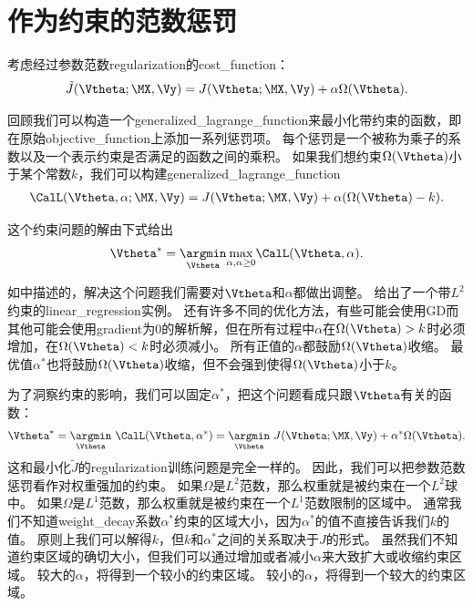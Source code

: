  
 \section{作为约束的范数惩罚}
 \label{sec:7.2}
考虑经过参数范数\gls{regularization}的\gls{cost_function}：
\begin{align}
 \tilde{J}(\Vtheta;\MX, \Vy) = J(\Vtheta;\MX, \Vy) + \alpha \Omega(\Vtheta) .
\end{align}

回顾我们可以构造一个\gls{generalized_lagrange_function}来最小化带约束的函数，即在原始\gls{objective_function}上添加一系列惩罚项。
每个惩罚是一个被称为乘子的系数以及一个表示约束是否满足的函数之间的乘积。
如果我们想约束$\Omega(\Vtheta)$小于某个常数$k$，我们可以构建\gls{generalized_lagrange_function}
\begin{align}
 \CalL(\Vtheta, \alpha; \MX, \Vy) = J(\Vtheta; \MX, \Vy) + \alpha (\Omega(\Vtheta) - k).
\end{align}

这个约束问题的解由下式给出
\begin{align}
 \Vtheta^* = \underset{\Vtheta}{ \argmin} \underset{\alpha, \alpha \geq 0}{\max} \CalL(\Vtheta, \alpha).
\end{align}

如中描述的，解决这个问题我们需要对$\Vtheta$和$\alpha$都做出调整。
给出了一个带$L^2$约束的\gls{linear_regression}实例。
还有许多不同的优化方法，有些可能会使用\gls{GD}而其他可能会使用\gls{gradient}为0的解析解，但在所有过程中$\alpha$在$\Omega(\Vtheta) > k$时必须增加，在$\Omega(\Vtheta) < k$时必须减小。
所有正值的$\alpha$都鼓励$\Omega(\Vtheta)$收缩。
最优值$\alpha^*$也将鼓励$\Omega(\Vtheta)$收缩，但不会强到使得$\Omega(\Vtheta)$小于$k$。

为了洞察约束的影响，我们可以固定$\alpha^*$，把这个问题看成只跟$\Vtheta$有关的函数：
\begin{align}
 \Vtheta^* =  \underset{\Vtheta}{ \argmin} ~\CalL(\Vtheta, \alpha^*) = 
 \underset{\Vtheta}{ \argmin}~
 J(\Vtheta; \MX, \Vy) + \alpha^* \Omega(\Vtheta).
\end{align}
这和最小化$\tilde J$的\gls{regularization}训练问题是完全一样的。
因此，我们可以把参数范数惩罚看作对权重强加的约束。
如果$\Omega$是$L^2$范数，那么权重就是被约束在一个$L^2$球中。
如果$\Omega$是$L^1$范数，那么权重就是被约束在一个$L^1$范数限制的区域中。
通常我们不知道\gls{weight_decay}系数$\alpha^*$约束的区域大小，因为$\alpha^*$的值不直接告诉我们$k$的值。
原则上我们可以解得$k$，但$k$和$\alpha^*$之间的关系取决于$J$的形式。
虽然我们不知道约束区域的确切大小，但我们可以通过增加或者减小$\alpha$来大致扩大或收缩约束区域。
较大的$\alpha$，将得到一个较小的约束区域。
较小的$\alpha$，将得到一个较大的约束区域。

